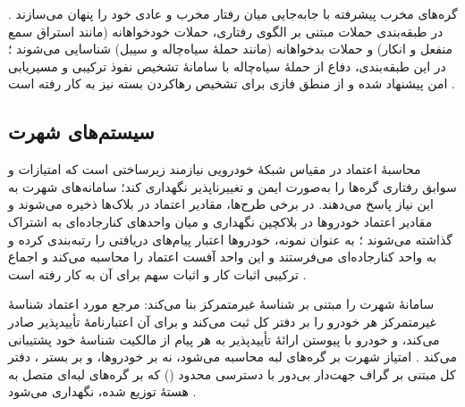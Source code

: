 گره‌های مخرب پیشرفته با جابه‌جایی میان رفتار مخرب و عادی خود را پنهان می‌سازند \cite{farsimadanReviewSecurityChallenges2025}. در طبقه‌بندی حملات مبتنی بر الگوی رفتاری، حملات خودخواهانه (مانند استراق سمع منفعل و انکار) و حملات بدخواهانه (مانند حملهٔ سیاه‌چاله و سیبل) شناسایی می‌شوند \cite{farsimadanReviewSecurityChallenges2025}؛ در این طبقه‌بندی، دفاع از حملهٔ سیاه‌چاله با سامانهٔ تشخیص نفوذ ترکیبی و مسیریابی امن پیشنهاد شده و از منطق فازی برای تشخیص رهاکردن بسته نیز به کار رفته است \cite{farsimadanReviewSecurityChallenges2025}.

\subsection{سیستم‌های شهرت}

محاسبهٔ اعتماد در مقیاس شبکهٔ خودرویی نیازمند زیرساختی است که امتیازات و سوابق رفتاری گره‌ها را به‌صورت ایمن و تغییرناپذیر نگهداری کند؛ سامانه‌های شهرت به این نیاز پاسخ می‌دهند. در برخی طرح‌ها، مقادیر اعتماد در بلاک‌ها ذخیره می‌شوند \cite{razaBlockchainBasedReputationTrust2024} و مقادیر اعتماد خودروها در بلاکچین نگهداری و میان واحدهای کنارجاده‌ای به اشتراک گذاشته می‌شوند \cite{farsimadanReviewSecurityChallenges2025}؛ به عنوان نمونه، خودروها اعتبار پیام‌های دریافتی را رتبه‌بندی کرده و به واحد کنارجاده‌ای می‌فرستند و این واحد آفست اعتماد را محاسبه می‌کند \cite{razaBlockchainBasedReputationTrust2024} و اجماع ترکیبی اثبات کار و اثبات سهم برای آن به کار رفته است \cite{razaBlockchainBasedReputationTrust2024}.

سامانهٔ  شهرت را مبتنی بر شناسهٔ غیرمتمرکز بنا می‌کند: مرجع مورد اعتماد شناسهٔ غیرمتمرکز هر خودرو را بر دفتر کل ثبت می‌کند و برای آن اعتبارنامهٔ تأییدپذیر صادر می‌کند، و خودرو با پیوستن ارائهٔ تأییدپذیر به هر پیام از مالکیت شناسهٔ خود پشتیبانی می‌کند \cite{feraudoDIVADIDbasedReputation2024}. امتیاز شهرت بر گره‌های لبه محاسبه می‌شود، نه بر خودروها، و بر بستر ، دفتر کل مبتنی بر گراف جهت‌دار بی‌دور با دسترسی محدود () که بر گره‌های لبه‌ای متصل به هستهٔ  توزیع شده، نگهداری می‌شود \cite{feraudoDIVADIDbasedReputation2024}.

